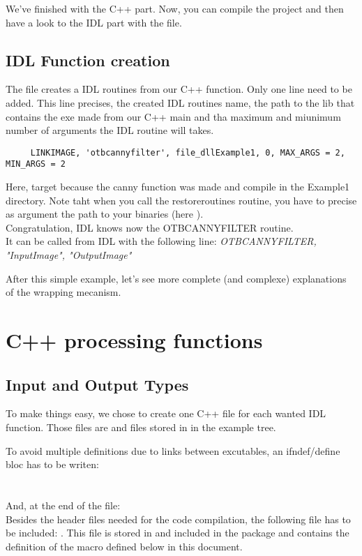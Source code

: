 We've finished with the C++ part. Now, you can compile the project and then have a look to the IDL part with the  file.

\subsection{IDL Function creation}
The  file creates a IDL routines from our C++ function.
Only one line need to be added. This line precises, the created IDL routines name, the path to the lib that contains the exe made from our C++ main and tha maximum and miunimum number of arguments the IDL routine will takes.
\begin{verbatim}
     LINKIMAGE, 'otbcannyfilter', file_dllExample1, 0, MAX_ARGS = 2, MIN_ARGS = 2
\end{verbatim}

Here,  target  because the canny function was made and compile in the Example1 directory.
Note taht when you call the restoreroutines routine, you have to precise as argument the path to your binaries (here ).\\
Congratulation, IDL knows now the OTBCANNYFILTER routine.\\
It can be called from IDL with the following line:
\emph {OTBCANNYFILTER, "InputImage", "OutputImage"}

After this simple example, let's see more complete (and complexe) explanations of the wrapping mecanism.

\section{C++ processing functions}
\label{cfiles}
\subsection{Input and Output Types}
To make things easy, we chose to create one C++ file for each wanted IDL function. Those files are  and  files stored in  in the example tree.

To avoid multiple definitions due to links between excutables, an ifndef/define bloc has to be writen:\\
\\
\\
And, at the end of the  file:
\\
Besides the header files needed for the code compilation, the following file has to be included: . This file is stored in  and included in the package and contains the definition of the  macro defined below in this document.

